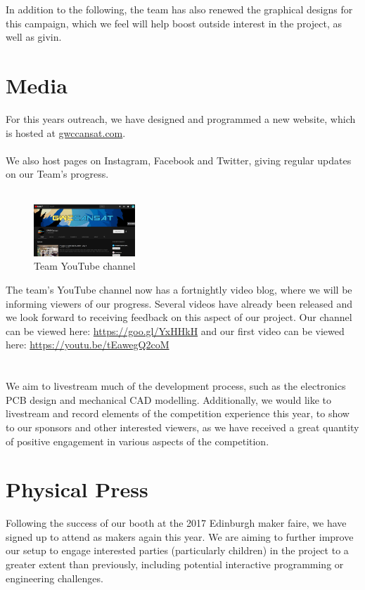 \documentclass{report}
\begin{document}
	In addition to the following, the team has also renewed the graphical designs
	for this campaign, which we feel will help boost outside interest in the project,
	as well as givin.
	
		
	\section{Media}
		For this years outreach, we have designed and programmed a new website,
		which is hosted at \url{gwccansat.com}.\\\\
		We also host pages on Instagram, Facebook and Twitter, giving regular
		updates	on our Team's progress.\\\\

		\begin{figure}
			\vspace{-30pt}
	 		\begin{center}
			\includegraphics[width=0.34\textwidth]{youtube}
			\end{center}
			\vspace{-15pt}
			\caption[X]{Team YouTube channel}
		\end{figure}

		\noindent
		The team's YouTube channel now has a fortnightly video blog, where we
		will be informing viewers of our progress. Several videos have already been
		released and we look forward to receiving feedback on this aspect of our
		project. Our channel can be viewed here: \url{https://goo.gl/YxHHkH} and 
		our first video can be viewed 
		here: \url{https://youtu.be/tEawegQ2coM}\\\\\\
		We aim to livestream much of the development process, such 
		as the electronics PCB design and mechanical CAD modelling. 
		Additionally, we
		would like to livestream and record elements of the competition experience
		this year, to show to our sponsors and other interested viewers, as we
		have received a great quantity of positive engagement in various aspects
		of the competition.
	
	\section{Physical Press}
		Following the success of our booth at the 2017 Edinburgh maker faire, we
		have signed up to attend as makers again this year. We are aiming to
		further improve our setup to engage interested parties (particularly children)
		in the 
		project to a greater extent than previously, including potential interactive
		programming or engineering challenges.\\\\
		\clearpage
\end{document}
